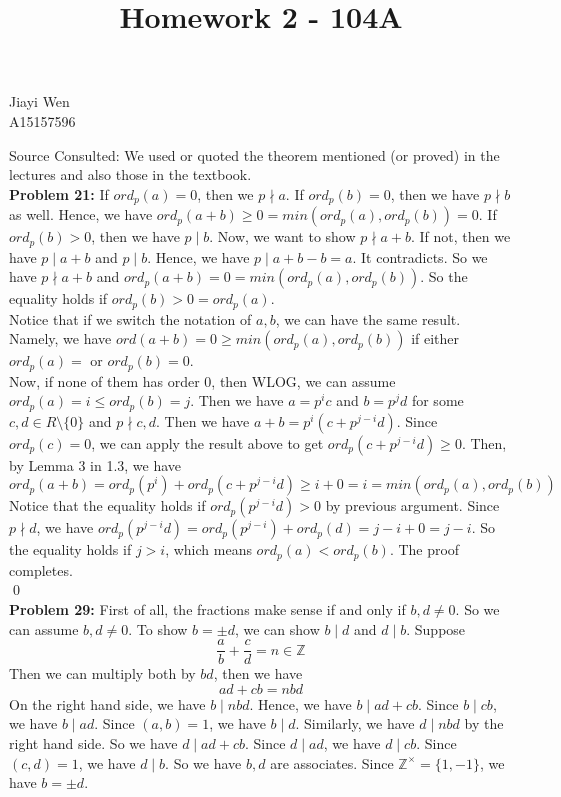 \documentclass[12pt]{amsart}
\newcommand{\Z}{\mathbb{Z}}
\begin{document}
\title{Homework 2 - 104A}
\maketitle
\begin{center}
    Jiayi Wen\\
    A15157596
\end{center}
Source Consulted: We used or quoted the theorem mentioned (or proved) in the lectures and also those in the textbook.\\
\textbf{Problem 21:} If $ord_p(a)=0$, then we $p\nmid a$. If $ord_p(b)=0$, then we have $p\nmid b$ as well. Hence, we have $ord_p(a+b)\geq 0=min(ord_p(a),ord_p(b))=0$. If $ord_p(b)>0$, then we have $p\mid b$. Now, we want to show $p\nmid a+b$. If not, then we have $p\mid a+b$ and $p\mid b$. Hence, we have $p\mid a+b-b=a$. It contradicts. So we have $p\nmid a+b$ and $ord_p(a+b)=0= min (ord_p(a),ord_p(b))$. So the equality holds if $ord_p(b)>0=ord_p(a).$\\
Notice that if we switch the notation of $a,b$, we can have the same result. Namely, we have $ord(a+b)=0\geq min(ord_p(a),ord_p(b))$ if either $ord_p(a)=$ or $ord_p(b)=0$.\\
Now, if none of them has order 0, then WLOG, we can assume $ord_p(a)=i\leq ord_p(b)=j$. Then we have $a=p^ic$ and $b=p^jd$ for some $c,d\in R\setminus\{0\}$ and $p\nmid c,d$. Then we have $a+b=p^i(c+p^{j-i}d)$. Since $ord_p(c)=0$, we can apply the result above to get $ord_p(c+p^{j-i}d)\geq 0$. Then, by Lemma 3 in 1.3, we have 
\[ord_p(a+b)=ord_p(p^i)+ord_p(c+p^{j-i}d)\geq i+0=i=min(ord_p(a),ord_p(b))\]
Notice that the equality holds if $ord_p(p^{j-i}d)>0$ by previous argument. Since $p\nmid d$, we have $ord_p(p^{j-i}d)=ord_p(p^{j-i})+ord_p(d)=j-i+0=j-i$. So the equality holds if $j>i$, which means $ord_p(a)< ord_p(b)$. The proof completes.
\\\qed\\
\textbf{Problem 29:} First of all, the fractions make sense if and only if $b,d\neq 0$. So we can assume $b,d\neq 0$. To show $b=\pm d$, we can show $b\mid d$ and $d\mid b$. Suppose 
\[\frac{a}{b}+\frac{c}{d}=n\in \Z\tag*{(1)}\]
Then we can multiply both by $bd$, then we have 
\[ad+cb=nbd\]
On the right hand side, we have $b\mid nbd$. Hence, we have $b\mid ad+cb$. Since $b\mid cb$, we have $b\mid ad$. Since $(a,b)=1$, we have $b\mid d$. Similarly, we have $d\mid nbd$ by the right hand side. So we have $d\mid ad+cb$. Since $d\mid ad$, we have $d\mid cb$. Since $(c,d)=1$, we have $d\mid b$. So we have $b,d$ are associates. Since $\Z^\times =\{1,-1\}$, we have $b=\pm d$.
\end{document}
